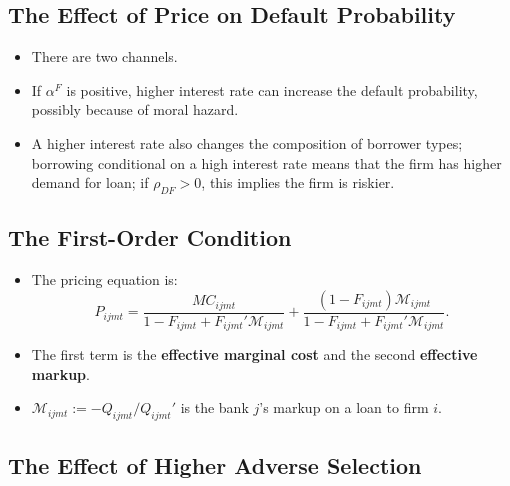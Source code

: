 \documentclass[]{book}
\providecommand{\tightlist}{%
  \setlength{\itemsep}{0pt}\setlength{\parskip}{0pt}}
\begin{document}
\subsection{The Effect of Price on Default
Probability}\label{the-effect-of-price-on-default-probability}

\begin{itemize}
\tightlist
\item
  There are two channels.
\item
  If \(\alpha^F\) is positive, higher interest rate can increase the
  default probability, possibly because of moral hazard.
\item
  A higher interest rate also changes the composition of borrower types;
  borrowing conditional on a high interest rate means that the firm has
  higher demand for loan; if \(\rho_{DF} > 0\), this implies the firm is
  riskier.
\end{itemize}

\subsection{The First-Order Condition}\label{the-first-order-condition}

\begin{itemize}
\tightlist
\item
  The pricing equation is: \[
  P_{ijmt} = \frac{MC_{ijmt}}{1 - F_{ijmt} + F_{ijmt}' \mathcal{M}_{ijmt}} + \frac{(1 - F_{ijmt}) \mathcal{M}_{ijmt}}{1 - F_{ijmt} + F_{ijmt}' \mathcal{M}_{ijmt}}.
  \]
\item
  The first term is the \textbf{effective marginal cost} and the second
  \textbf{effective markup}.
\item
  \(\mathcal{M}_{ijmt} := - Q_{ijmt} / Q_{ijmt}'\) is the bank \(j\)'s
  markup on a loan to firm \(i\).
\end{itemize}

\subsection{The Effect of Higher Adverse
Selection}\label{the-effect-of-higher-adverse-selection}
\end{document}
